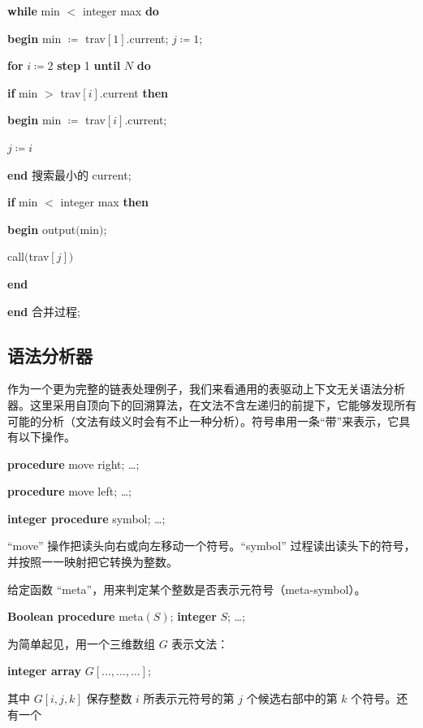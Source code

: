 \quad \textbf{while} min $<$ integer max \textbf{do}

\quad \quad \textbf{begin} min $\coloneq$ trav$[1]$.current; $j\coloneq 1$;

\quad \quad \quad \textbf{for} $i\coloneq 2$ \textbf{step} 1 \textbf{until} $N$ \textbf{do}

\quad \quad \quad \quad \textbf{if} min $>$ trav$[i]$.current \textbf{then}

\quad \quad \quad \quad \quad \textbf{begin} min $\coloneq$ trav$[i]$.current;

\quad \quad \quad \quad \quad \quad $j\coloneq i$

\quad \quad \quad \quad \quad \textbf{end} 搜索最小的 current;

\quad \quad \quad \textbf{if} min $<$ integer max \textbf{then}

\quad \quad \quad \quad \textbf{begin} output$($min$)$;

\quad \quad \quad \quad \quad call$($trav$[j])$

\quad \quad \quad \quad \textbf{end}

\quad \quad \textbf{end} 合并过程;

\subsection{语法分析器}

作为一个更为完整的链表处理例子，我们来看通用的表驱动上下文无关语法分析器。这里采用自顶向下的回溯算法，在文法不含左递归的前提下，它能够发现所有可能的分析（文法有歧义时会有不止一种分析）。符号串用一条“带”来表示，它具有以下操作。

\quad \textbf{procedure} move right; \dots;

\quad \textbf{procedure} move left; \dots;

\quad \textbf{integer procedure} symbol; \dots;

\noindent
``move'' 操作把读头向右或向左移动一个符号。``symbol'' 过程读出读头下的符号，并按照一一映射把它转换为整数。

给定函数 ``meta''，用来判定某个整数是否表示元符号（meta-symbol）。

\quad \textbf{Boolean procedure} meta$(S)$; \textbf{integer} $S$; \dots;

\noindent
为简单起见，用一个三维数组 $G$ 表示文法：

\quad \textbf{integer array} $G[\dots, \dots, \dots]$;

\noindent
其中 $G[i, j, k]$ 保存整数 $i$ 所表示元符号的第 $j$ 个候选右部中的第 $k$ 个符号。还有一个

